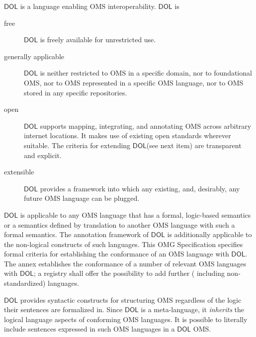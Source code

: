 \documentclass[10pt,fleqn,final]{scrreprt}
\newcommand*{\IS}{OMG Specification\xspace}
\newcommand*{\DOL}{\ensuremath{\mathsf{DOL}}\xspace}
\newenvironment{definitions}[0]{\medskip }{}
\begin{document}
\begin{definitions}
\DOL is a language enabling OMS interoperability. 
\DOL is
\begin{description}
\item[free] \DOL is freely available for unrestricted use.
\item[generally applicable] \DOL is neither restricted to OMS in a specific domain, nor to foundational OMS, nor to OMS represented in a specific OMS language, nor to OMS stored in any specific repositories.
\item[open] \DOL supports mapping, integrating, and annotating OMS across arbitrary internet locations.  It makes use of existing open standards wherever suitable.  The criteria for extending \DOL (see next item) are transparent and explicit.
\item[extensible] \DOL provides a framework into which any existing, and, desirably, any future OMS language can be plugged.
\end{description}
\DOL is applicable to any OMS language that has a formal, logic-based semantics or a semantics defined by translation to another OMS language with such a formal semantics. The annotation framework of \DOL is additionally applicable to the non-logical constructs of such languages. This \IS specifies formal criteria for establishing the conformance of an OMS language with \DOL.  The annex establishes the conformance of a number of relevant OMS languages with \DOL; a registry shall offer the possibility to add further ( including non-standardized) languages. 

\DOL provides syntactic constructs for structuring OMS regardless of the logic their sentences are formalized in. 
Since \DOL is a meta-language,  it \textit{inherits} the logical language aspects of conforming OMS languages.  It is possible to literally include sentences expressed in such OMS languages in a \DOL OMS.



\end{definitions}
\end{document}

